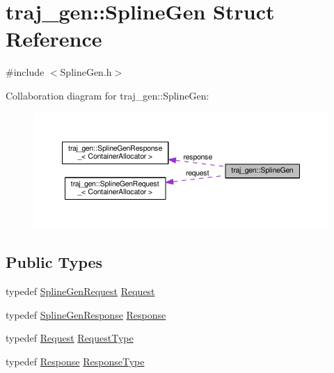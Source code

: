 \hypertarget{structtraj__gen_1_1_spline_gen}{}\section{traj\+\_\+gen\+:\+:Spline\+Gen Struct Reference}
\label{structtraj__gen_1_1_spline_gen}


{\ttfamily \#include $<$Spline\+Gen.\+h$>$}



Collaboration diagram for traj\+\_\+gen\+:\+:Spline\+Gen\+:
\nopagebreak
\begin{figure}[H]
\begin{center}
\leavevmode
\includegraphics[width=350pt]{structtraj__gen_1_1_spline_gen__coll__graph}
\end{center}
\end{figure}
\subsection*{Public Types}
\begin{DoxyCompactItemize}
\item 
typedef \hyperlink{namespacetraj__gen_a61c65203f503c18d4b3cb68b9ee74a74}{Spline\+Gen\+Request} \hyperlink{structtraj__gen_1_1_spline_gen_ab96a82d9b2fbbf58a10b9b109a33a515}{Request}
\item 
typedef \hyperlink{namespacetraj__gen_a96b15a7eb1a4a1209fba2e9d75acb7a4}{Spline\+Gen\+Response} \hyperlink{structtraj__gen_1_1_spline_gen_ab9c7eb3601b97640e160b4b49722c069}{Response}
\item 
typedef \hyperlink{structtraj__gen_1_1_spline_gen_ab96a82d9b2fbbf58a10b9b109a33a515}{Request} \hyperlink{structtraj__gen_1_1_spline_gen_a2482f67c0e1cdd141df845186e9a8cd4}{Request\+Type}
\item 
typedef \hyperlink{structtraj__gen_1_1_spline_gen_ab9c7eb3601b97640e160b4b49722c069}{Response} \hyperlink{structtraj__gen_1_1_spline_gen_aa671e3204a54f89c4ebc66ed73ee89ab}{Response\+Type}
\end{DoxyCompactItemize}

